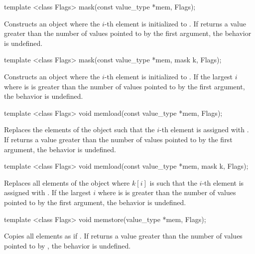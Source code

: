 \begin{itemdecl}
template <class Flags> mask(const value_type *mem, Flags);
\end{itemdecl}
\begin{itemdescr}
  \pnum\effects Constructs an object where the $i$-th element is initialized to  \foralli.
  \pnum\remarks If  returns a value greater than the number of values pointed to by the first argument, the behavior is undefined.
  \flagsRemarks{\mask{}}
\end{itemdescr}

\begin{itemdecl}
template <class Flags> mask(const value_type *mem, mask k, Flags);
\end{itemdecl}
\begin{itemdescr}
  \pnum\effects Constructs an object where the $i$-th element is initialized to  \foralli.
  \pnum\remarks If the largest $i$ where  is \true is greater than the number of values pointed to by the first argument, the behavior is undefined.
  \flagsRemarks{\mask{}}
\end{itemdescr}

\begin{itemdecl}
template <class Flags> void memload(const value_type *mem, Flags);
\end{itemdecl}
\begin{itemdescr}
  \pnum\effects Replaces the elements of the \mask object such that the $i$-th element is assigned with  \foralli.
  \pnum\remarks If  returns a value greater than the number of values pointed to by the first argument, the behavior is undefined.
  \flagsRemarks{\mask{}}
\end{itemdescr}

\begin{itemdecl}
template <class Flags> void memload(const value_type *mem, mask k, Flags);
\end{itemdecl}
\begin{itemdescr}
  \pnum\effects Replaces all elements of the \mask object where $k[i]$ is \true such that the $i$-th element is assigned with  \foralli.
  \pnum\remarks If the largest $i$ where  is \true is greater than the number of values pointed to by the first argument, the behavior is undefined.
  \flagsRemarks{\mask{}}
\end{itemdescr}

\begin{itemdecl}
template <class Flags> void memstore(value_type *mem, Flags);
\end{itemdecl}
\begin{itemdescr}
  \pnum\effects Copies all \mask elements as if  \foralli.
  \pnum\remarks If  returns a value greater than the number of values pointed to by , the behavior is undefined.
  \flagsRemarks{\mask{}}
\end{itemdescr}

